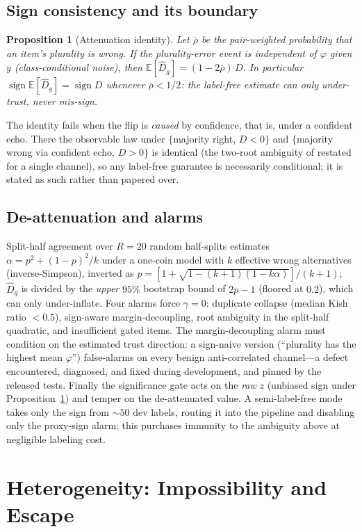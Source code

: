 \documentclass{article}
\newtheorem{proposition}{Proposition}
\newcommand{\Dhat}{\widehat{D}}
\newcommand{\sign}{\operatorname{sign}}
\begin{document}
\subsection{Sign consistency and its boundary}
\begin{proposition}[Attenuation identity]\label{prop:ccn}
Let $\bar\rho$ be the pair-weighted probability that an item's plurality is wrong. If the plurality-error event is independent of $\varphi$ given $y$ (class-conditional noise), then
$\mathbb{E}[\Dhat_g]=(1-2\bar\rho)\,D$.
In particular $\sign\mathbb{E}[\Dhat_g]=\sign D$ whenever $\bar\rho<1/2$: the label-free estimate can only under-trust, never mis-sign.
\end{proposition}
The identity fails when the flip is \emph{caused} by confidence, that is, under a confident echo. There the observable law under $\{$majority right, $D<0\}$ and $\{$majority wrong via confident echo, $D>0\}$ is identical (the two-root ambiguity of \citet{parisi2014ranking} restated for a single channel), so any label-free guarantee is necessarily conditional; it is stated as such rather than papered over.

\subsection{De-attenuation and alarms}
Split-half agreement over $R{=}20$ random half-splits estimates $\alpha=p^2+(1-p)^2/k$ under a one-coin model with $k$ effective wrong alternatives (inverse-Simpson), inverted as $p=[1+\sqrt{1-(k{+}1)(1-k\alpha)}]/(k{+}1)$; $\Dhat_g$ is divided by the \emph{upper} $95\%$ bootstrap bound of $2p-1$ (floored at $0.2$), which can only under-inflate. Four alarms force $\gamma=0$: duplicate collapse (median Kish ratio $<0.5$), sign-aware margin-decoupling, root ambiguity in the split-half quadratic, and insufficient gated items. The margin-decoupling alarm must condition on the estimated trust direction: a sign-naive version (``plurality has the highest mean $\varphi$'') false-alarms on every benign anti-correlated channel---a defect encountered, diagnosed, and fixed during development, and pinned by the released tests. Finally the significance gate acts on the \emph{raw} $z$ (unbiased sign under Proposition~\ref{prop:ccn}) and temper on the de-attenuated value. A semi-label-free mode takes only the sign from ${\sim}50$ dev labels, routing it into the pipeline and disabling only the proxy-sign alarm; this purchases immunity to the ambiguity above at negligible labeling cost.

\section{Heterogeneity: Impossibility and Escape}\label{sec:hetero}
\end{document}
